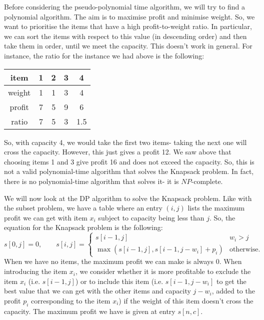 \documentclass[a4paper, openany]{memoir}
\begin{document}
    Before considering the pseudo-polynomial time algorithm, we will try to find a polynomial algorithm. The aim is to maximise profit and minimise weight. So, we want to prioritise the items that have a high profit-to-weight ratio. In particular, we can sort the items with respect to this value (in descending order) and then take them in order, until we meet the capacity. This doesn't work in general. For instance, the ratio for the instance we had above is the following:
    \begin{table}[H]
        \centering
        \begin{tabular}{c|cccc}
            item & 1 & 2 & 3 & 4 \\
            \hline
            weight & 1 & 1 & 3 & 4 \\
            \hline
            profit & 7 & 5 & 9 & 6  \\
            \hline
            ratio & 7 & 5 & 3 & 1.5
        \end{tabular}
    \end{table}
    \noindent So, with capacity 4, we would take the first two items- taking the next one will cross the capacity. However, this just gives a profit 12. We saw above that choosing items 1 and 3 give profit 16 and does not exceed the capacity. So, this is not a valid polynomial-time algorithm that solves the Knapsack problem. In fact, there is no polynomial-time algorithm that solves it- it is $NP$-complete.

    We will now look at the DP algorithm to solve the Knapsack problem. Like with the subset problem, we have a table where an entry $(i, j)$ lists the maximum profit we can get with item $x_i$ subject to capacity being less than $j$. So, the equation for the Knapsack problem is the following:
    \[s[0, j] = 0, \qquad s[i, j] = \begin{cases}
        s[i-1, j] & w_i > j \\
        \max(s[i-1, j], s[i-1, j-w_i] + p_i) & \text{otherwise}.
    \end{cases}\]
    When we have no items, the maximum profit we can make is always $0$. When introducing the item $x_i$, we consider whether it is more profitable to exclude the item $x_i$ (i.e. $s[i-1, j]$) or to include this item (i.e. $s[i-1, j-w_i]$ to get the best value that we can get with the other items and capacity $j-w_i$, added to the profit $p_i$ corresponding to the item $x_i$) if the weight of this item doesn't cross the capacity. The maximum profit we have is given at entry $s[n, c]$. 
    
\end{document}
